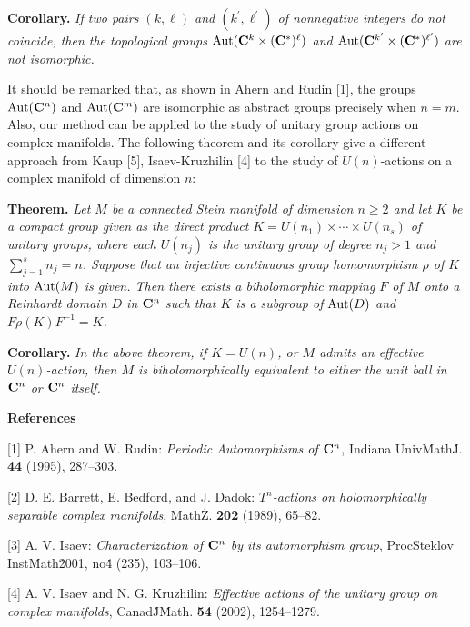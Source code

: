 {\bf Corollary.}
{\it If two pairs
$(k, \ell)$
and
$(k^{\prime}, \ell^{\prime})$
of nonnegative integers
do not coincide,
then the topological groups
$\text{\rm Aut}
 (\bold C^k
 \times
 (\bold C^{\ast})^{\ell})$
and
$\text{\rm Aut}
 (\bold C^{k^{\prime}}
 \times
 (\bold C^{\ast})^{\ell^{\prime}})$
are not isomorphic.}
\par
\vskip 0.4cm
It should be remarked that, as shown in Ahern and Rudin [1], the groups $\text{\rm Aut}({\bold C}^n)$ and $\text{\rm Aut}({\bold C}^m)$ are isomorphic as abstract groups precisely when $n=m$. Also, our method can be applied to the study of unitary group actions on complex manifolds. The following theorem and its corollary give a different approach from Kaup [5], Isaev-Kruzhilin [4] to the study of $U(n)$-actions on a complex manifold of dimension $n$:
\par
\vskip 0.4cm
{\bf Theorem.}
{\it Let $M$ be a connected Stein manifold
of dimension $n \ge 2$
and let $K$ be a compact group given as
the direct product
$K = U(n_{1}) \times \cdots \times U(n_{s})$
of unitary groups,
where each $U(n_{j})$ is the unitary group
of degree $n_{j} > 1$ and
$\sum_{j = 1}^{s} n_{j} = n$.
Suppose that
an injective continuous group homomorphism
$\rho$ of $K$ into $\text{\rm Aut}(M)$
is given.
Then there exists a biholomorphic mapping $F$
of $M$ onto a Reinhardt domain $D$ in $\bold C^n$
such that $K$ is a subgroup of $\text{\rm Aut}(D)$
and $F \rho(K) F^{-1} = K$.}
\par
\vskip 0.4cm
{\bf Corollary.}
{\it In the above theorem,
if $K = U(n)$, or $M$ admits an effective
$U(n)$-action, then
$M$ is biholomorphically equivalent to
either the unit ball in $\bold C^n$
or $\bold C^n$ itself.}
\par
\vskip 0.5cm
\centerline{{\bf References}}
\vskip 0.7cm
\item{[1]} P. Ahern and W. Rudin:  {\it Periodic Automorphisms of ${\bold C}^n$},  Indiana Univ\. Math\. J. {\bf 44} (1995), 287--303.
\item{[2]} D. E. Barrett, E. Bedford, and J. Dadok:  {\it $T^n$-actions on holomorphically separable complex manifolds},  Math\. Z. {\bf 202} (1989), 65--82.
\item{[3]} A. V. Isaev:  {\it Characterization of $\bold C^n$ by its automorphism group},  Proc\. Steklov Inst\. Math\. 2001, no\. 4 (235), 103--106.
\item{[4]} A. V. Isaev and N. G. Kruzhilin:  {\it Effective actions of the unitary group on complex manifolds},  Canad\. J\. Math. {\bf 54} (2002), 1254--1279.
